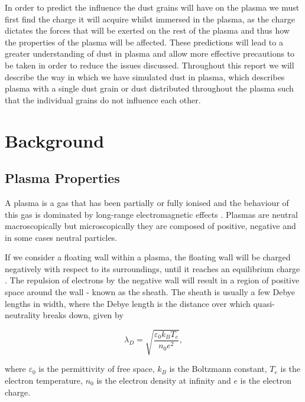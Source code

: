 \documentclass[journal]{Imperial_lab_report}
\begin{document}
\smallskip

In order to predict the influence the dust grains will have on the plasma we must first find the charge it will acquire whilst immersed in the plasma, as the charge dictates the forces that will be exerted on the rest of the plasma and thus how the properties of the plasma will be affected. These predictions will lead to a greater understanding of dust in plasma and allow more effective precautions to be taken in order to reduce the issues discussed. Throughout this report we will describe the way in which we have simulated dust in plasma, which describes plasma with a single dust grain or dust distributed throughout the plasma such that the individual grains do not influence each other. 

\section{Background}

\subsection{Plasma Properties}

\smallskip

A plasma is a gas that has been partially or fully ionised and the behaviour of this gas is dominated by long-range electromagnetic effects \cite{Willis}. Plasmas are neutral macroscopically but microscopically they are composed of positive, negative and in some cases neutral particles. 

\medskip

If we consider a floating wall within a plasma, the floating wall will be charged negatively with respect to its surroundings, until it reaches an equilibrium charge \cite{Willis}. The repulsion of electrons by the negative wall will result in a region of positive space around the wall - known as the sheath. The sheath is usually a few Debye lengths in width, where the Debye length is the distance over which quasi-neutrality breaks down, given by 

\begin{equation}\label{eq:Debye}
\lambda_D = \sqrt{\frac{\varepsilon_{0} k_{B} T_{e}}{n_{0} e^2}},
\end{equation}

\noindent where $\varepsilon_{0}$ is the permittivity of free space, $k_B$ is the Boltzmann constant, $T_e$ is the electron temperature, $n_0$ is the electron density at infinity and $e$ is the electron charge.
\end{document}
